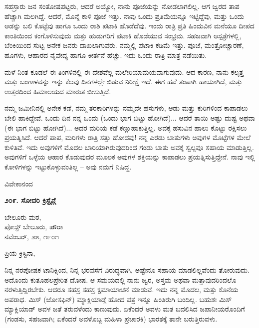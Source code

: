 ಸಹಸ್ರಾರು ಜನ ಸಂತೋಷಪಟ್ಟರು, ಆದರೆ ಅಯ್ಯೋ, ನಾನು ಪೂಜೆಯನ್ನು ನೋಡಲಾಗಲಿಲ್ಲ. ಆಗ ಜ್ವರದ ತಾಪ ಹೆಚ್ಚಾಗಿ ಮಲಗಿದ್ದೆ. ಆದರೆ, ಮೊನ್ನೆ ಕಾಳಿ ಪೂಜೆ ಇತ್ತು. ನಾವು ಒಂದು ಪ್ರತಿಮೆಯನ್ನೂ ಇಟ್ಟಿದ್ದೆವು, ಮತ್ತು ಒಂದು ಆಡನ್ನು ಬಲಿ ಕೊಟ್ಟೆವು ಹಾಗೂ ಒಂದು ರಾಶಿ ಪಟಾಕಿ ಹೊಡೆದೆವು. ಇಂದು ರಾತ್ರಿ ಪ್ರತಿ ಹಿಂದುವಿನ ಮನೆಯೂ ದೀಪದ ಕಾಂತಿಯಿಂದ ಕಂಗೊಳಿಸುವುದು ಮತ್ತು ಹುಡುಗರಿಗೆ ಪಟಾಕಿ ಹೊಡೆಯುವ ಸಂಭ್ರಮ. ಸಹಜವಾಗಿ ಆಸ್ಪತ್ರೆಗಳಲ್ಲಿ, ಬೆಂಕಿಯಿಂದ ಸುಟ್ಟ ಅನೇಕ ಜನರು ದಾಖಲಾಗುವರು. ನಮ್ಮಲ್ಲಿ ಪಟಾಕಿ ಕಡಿಮೆ ಇತ್ತು. ಪೂಜೆ, ಮಂತ್ರೋಚ್ಚಾರಣೆ, ಹೂಗಳು, ಆಹಾರದ ನೈವೇದ್ಯ ಹಾಗೂ ಕೀರ್ತನೆ ಹೆಚ್ಚು. ಇದು ಒಂದು ರಾತ್ರಿ ಮಾತ್ರ ನಡೆಯಿತು.

ಮಳೆ ನಿಂತ ಕೂಡಲೆ ಈ ತಿಂಗಳಿನಲ್ಲಿ ಈ ದೇಶವೆಲ್ಲ ಮಲೇರಿಯಾಮಯವಾಗುವುದು. ಆದ ಕಾರಣ, ನಾನು ಕಲ್ಕತ್ತ ಮತ್ತು ಬಂಗಾಳವನ್ನು ಇನ್ನು ಕೆಲವು ದಿನಗಳಲ್ಲೇ ಬಿಡುವ ನಿರೀಕ್ಷೆ ಇದೆ. ಈಗ ಹವೆ ತಂಪಾಗಿ ಹಾಯಾಗಿದೆ, ಮತ್ತು ಉತ್ತರದಿಂದ ಹಿಮಾಲಯದ ಮಾರುತ ಬೀಸುತ್ತಿದೆ.

ನಮ್ಮ ಜಮೀನಿನಲ್ಲಿ ಅನೇಕ ಕಡೆ, ನಮ್ಮ ತರಕಾರಿಗಳನ್ನು ನಮ್ಮದೇ ಹಸುಗಳು, ಆಡು ಮತ್ತು ಕುರಿಗಳಿಂದ ಕಾಪಾಡಲು ಬೇಲಿ ಹಾಕಿದ್ದೇವೆ. ಒಂದು ದಿನ ನನ್ನ ಒಂದು (ಒಂದು ಭಾಗ ಬಿಟ್ಟು ಹೋಗಿದೆ)... ಆದರೆ ತಾಯಿ ಅಷ್ಟು ದುಷ್ಟ ಅಥವಾ (ಈ ಭಾಗ ಬಿಟ್ಟು ಹೋಗಿದೆ)... ಅದರ ಮರಿಯ ಕಡೆ ಕಣ್ಣುಹಾಕುತ್ತಿಲ್ಲ. ಅವಕ್ಕೆ ಹಸುವಿನ ಹಾಲು ಕೊಟ್ಟು ರಕ್ಷಿಸಲು ಪ್ರಯತ್ನಿಸಿದೆ. ಆದರೆ ಪಾಪ, ಮರಿಗಳು ರಾತ್ರಿ ಸತ್ತು ಹೋದವು! ನನ್ನ ಎರಡು ಬಾತುಗಳು ಅವುಗಳ ಮೊಟ್ಟೆಗಳ ಮೇಲೆ ಕುಳಿತಿವೆ. ಇದು ಅವುಗಳಿಗೆ ಮೊದಲ ಬಾರಿಯಾಗಿರುವುದರಿಂದ ಗಂಡು ಬಾತು ಅವಕ್ಕೆ ಸ್ವಲ್ಪವೂ ಸಹಾಯ ಮಾಡುತ್ತಿಲ್ಲ. ಅವುಗಳಿಗೆ ಒಳ್ಳೆಯ ಆಹಾರ ಕೊಡುವುದರ ಮೂಲಕ ಅವುಗಳ ಶಕ್ತಿಯನ್ನು ಕಾಪಾಡಲು ಪ್ರಯತ್ನಿಸುತ್ತಿದ್ದೇನೆ. ನಾವು ಇಲ್ಲಿ ಕೋಳಿಗಳನ್ನು ಇಟ್ಟುಕೊಳ್ಳುವಂತಿಲ್ಲ – ಅವು ನಮಗೆ ನಿಷಿದ್ಧ.

\begin{flushright}
ವಿವೇಕಾನಂದ
\end{flushright}

\begin{center}
\textbf{೨೦೯. ಸೋದರಿ ಕ್ರಿಸ್ಟೈನ್ಗೆ}
\end{center}

\begin{flushright}
ಬೇಲೂರು ಮಠ,\\ಪೋಸ್ಟ್ ಬೇಲೂರು, ಹೌರಾ\\ನವೆಂಬರ್, ೨೫, ೧೯೦೧
\end{flushright}

ಪ್ರಿಯ ಕ್ರಿಸ್ಟಿನಾ,

ನಿನ್ನ ನರಪೋಷಕ ಟಾನಿಕ್ನಿಂದ, ನಿನ್ನ ಭರವಸೆಗೆ ವಿರುದ್ಧವಾಗಿ, ಅಷ್ಟೇನೂ ಸಹಾಯ ಮಾಡಲಿಲ್ಲವೆಂದು ತೋರುವುದು. ಅದೊಂದು ಕುತೂಹಲಪ್ರೇರಿತ ದೋಷ. ಆ ಸಮಯದಲ್ಲಿ ನಾನು ಜ್ವರ, ಅಸ್ತಮ ಅಥವಾ ಮತ್ತಾವುದರಿಂದಲೊ ನರಳುತ್ತಿದ್ದಿರಬೇಕು. ಆದರೂ ಸಹಸ್ರ ಸಹಸ್ರ ಕ್ಷಮಾಯಾಚನೆ ಮಾಡುವೆ. ಇದು ನನ್ನ ಮೊದಲ, ಮತ್ತು ಕೊನೆಯ ಅಪರಾಧ. ಮಿಸ್ (ಜೋಸಫಿನ್) ಮ್ಯಾಕ್ಲಿಯಾಡ್ಗೆ ಹೋದ ಪತ್ರ ಇನ್ನೂ ಹಿಂತಿರುಗಿ ಬಂದಿಲ್ಲ. ಬಹುಶಃ ಮಿಸ್ ಮ್ಯಾಕ್ಲಿಯಾಡ್ ಅವಳ ಜತೆ ತರುವಳೆಂದು ಕಾಣುವುದು. ಏಕೆಂದರೆ ಅವಳು ಮತ ಬದಲಿಸಿದ ಜಪಾನೀಯರೊಂದಿಗೆ (ಗಂಡಸು, ಸಹಜವಾಗಿ; ಏಕೆಂದರೆ ಅವಳೊಬ್ಬ ಮಹಿಳಾ ಪ್ರಚಾರಕಿ) ಭಾರತಕ್ಕೆ ತಾನೇ ಬರುತ್ತಿರುವಳು.

